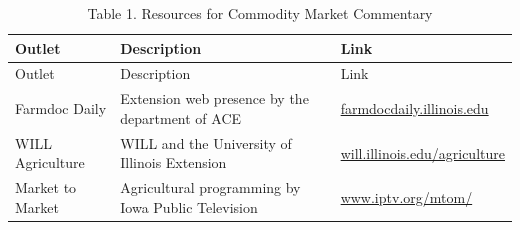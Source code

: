 \documentclass[]{book}
\theoremstyle{definition}
\theoremstyle{definition}
\theoremstyle{remark}
\begin{document}
\begin{longtable}[]{@{}lll@{}}
\caption{Table 1. Resources for Commodity Market
Commentary}\tabularnewline
\toprule
\begin{minipage}[b]{0.14\columnwidth}\raggedright\strut
Outlet\strut
\end{minipage} & \begin{minipage}[b]{0.25\columnwidth}\raggedright\strut
Description\strut
\end{minipage} & \begin{minipage}[b]{0.23\columnwidth}\raggedright\strut
Link\strut
\end{minipage}\tabularnewline
\midrule
\endfirsthead
\toprule
\begin{minipage}[b]{0.14\columnwidth}\raggedright\strut
Outlet\strut
\end{minipage} & \begin{minipage}[b]{0.25\columnwidth}\raggedright\strut
Description\strut
\end{minipage} & \begin{minipage}[b]{0.23\columnwidth}\raggedright\strut
Link\strut
\end{minipage}\tabularnewline
\midrule
\endhead
\begin{minipage}[t]{0.14\columnwidth}\raggedright\strut
Farmdoc Daily\strut
\end{minipage} & \begin{minipage}[t]{0.25\columnwidth}\raggedright\strut
Extension web presence by the department of ACE\strut
\end{minipage} & \begin{minipage}[t]{0.23\columnwidth}\raggedright\strut
\href{http://farmdocdaily.illinois.edu}{farmdocdaily.illinois.edu}\strut
\end{minipage}\tabularnewline
\begin{minipage}[t]{0.14\columnwidth}\raggedright\strut
WILL Agriculture\strut
\end{minipage} & \begin{minipage}[t]{0.25\columnwidth}\raggedright\strut
WILL and the University of Illinois Extension\strut
\end{minipage} & \begin{minipage}[t]{0.23\columnwidth}\raggedright\strut
\href{http://will.illinois.edu/agriculture}{will.illinois.edu/agriculture}\strut
\end{minipage}\tabularnewline
\begin{minipage}[t]{0.14\columnwidth}\raggedright\strut
Market to Market\strut
\end{minipage} & \begin{minipage}[t]{0.25\columnwidth}\raggedright\strut
Agricultural programming by Iowa Public Television\strut
\end{minipage} & \begin{minipage}[t]{0.23\columnwidth}\raggedright\strut
\href{http://www.iptv.org/mtom/}{www.iptv.org/mtom/}\strut
\end{minipage}\tabularnewline
\bottomrule
\end{longtable}
\end{document}

